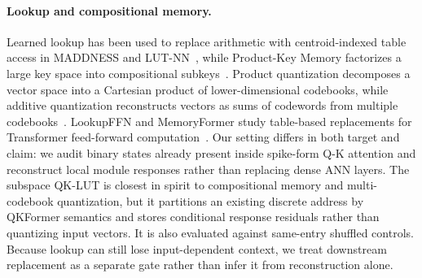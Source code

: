 \paragraph{Lookup and compositional memory.}
Learned lookup has been used to replace arithmetic with centroid-indexed table
access in MADDNESS and LUT-NN~\cite{blalock2021maddness,tang2023lutnn}, while
Product-Key Memory factorizes a large key space into compositional
subkeys~\cite{lample2019large}. Product quantization decomposes a vector space
into a Cartesian product of lower-dimensional codebooks, while additive
quantization reconstructs vectors as sums of codewords from multiple
codebooks~\cite{jegou2011product,babenko2014additive}. LookupFFN and MemoryFormer study table-based
replacements for Transformer feed-forward
computation~\cite{zeng2023lookupffn,wang2024memoryformer}. Our setting differs in both target and
claim: we audit binary states already present inside spike-form Q-K attention
and reconstruct local module responses rather than replacing dense ANN layers.
The subspace QK-LUT is closest in spirit to compositional memory and
multi-codebook quantization, but it partitions an existing discrete address by
QKFormer semantics and stores conditional response residuals rather than
quantizing input vectors. It is also evaluated against same-entry shuffled
controls. Because lookup can still lose input-dependent context, we treat
downstream replacement as a separate gate rather than infer it from
reconstruction alone.

